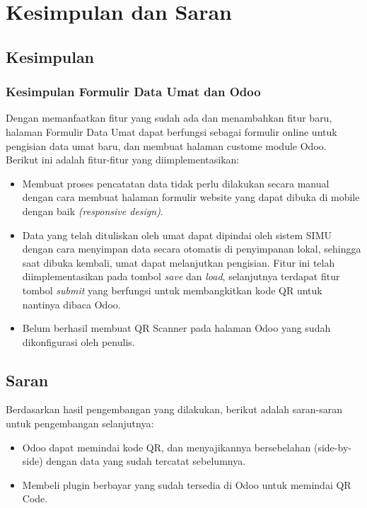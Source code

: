 \chapter{Kesimpulan dan Saran}
\label{chap:kesimpulandansaran}

\section{Kesimpulan}
\label{sec:kesimpulan}

\subsection{Kesimpulan Formulir Data Umat dan Odoo}
\label{sec:6:kesimpulanFormulir}

Dengan memanfaatkan fitur yang sudah ada dan menambahkan fitur baru, halaman Formulir Data Umat dapat berfungsi sebagai formulir online untuk pengisian data umat baru, dan membuat halaman custome module Odoo. Berikut ini adalah fitur-fitur yang diimplementasikan:
	
\begin{itemize}
	
	\item Membuat proses pencatatan data tidak perlu dilakukan secara manual dengan cara membuat halaman formulir website yang dapat dibuka di mobile dengan baik \textit{(responsive design)}.
	\item Data yang telah dituliskan oleh umat dapat dipindai oleh sistem SIMU dengan cara menyimpan data secara otomatis di penyimpanan lokal, sehingga saat dibuka kembali, umat dapat melanjutkan pengisian. Fitur ini telah diimplementasikan pada tombol \textit{save} dan \textit{load}, selanjutnya terdapat fitur tombol \textit{submit} yang berfungsi untuk membangkitkan kode QR untuk nantinya dibaca Odoo.
	\item Belum berhasil membuat QR Scanner pada halaman Odoo yang sudah dikonfigurasi oleh penulis.
\end{itemize}

\section{Saran}
\label{sec:saran}
Berdasarkan hasil pengembangan yang dilakukan, berikut adalah saran-saran untuk pengembangan selanjutnya:

\begin{itemize}
	\item Odoo dapat memindai kode QR, dan menyajikannya bersebelahan (side-by-side) dengan data yang sudah tercatat sebelumnya.
	\item Membeli plugin berbayar yang sudah tersedia di Odoo untuk memindai QR Code.
\end{itemize}

